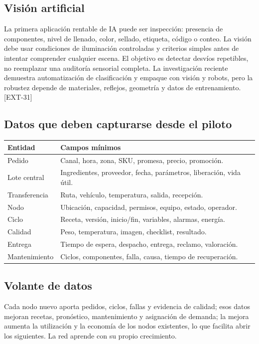 \documentclass[11pt,a4paper]{article}
\begin{document}
\subsection{Visión artificial}
La primera aplicación rentable de IA puede ser inspección: presencia de componentes, nivel de llenado,
color, sellado, etiqueta, código o conteo. La visión debe usar condiciones de iluminación controladas y
criterios simples antes de intentar comprender cualquier escena. El objetivo es detectar desvíos
repetibles, no reemplazar una auditoría sensorial completa. La investigación reciente demuestra
automatización de clasificación y empaque con visión y robots, pero la robustez depende de materiales,
reflejos, geometría y datos de entrenamiento. [EXT-31]

\subsection{Datos que deben capturarse desde el piloto}
{\small
\begin{xltabular}{\textwidth}{@{}P{3.2cm}L@{}}
\toprule
\textbf{Entidad} & \textbf{Campos mínimos}\\ \midrule
Pedido & Canal, hora, zona, SKU, promesa, precio, promoción.\\
Lote central & Ingredientes, proveedor, fecha, parámetros, liberación, vida útil.\\
Transferencia & Ruta, vehículo, temperatura, salida, recepción.\\
Nodo & Ubicación, capacidad, permisos, equipo, estado, operador.\\
Ciclo & Receta, versión, inicio/fin, variables, alarmas, energía.\\
Calidad & Peso, temperatura, imagen, checklist, resultado.\\
Entrega & Tiempo de espera, despacho, entrega, reclamo, valoración.\\
Mantenimiento & Ciclos, componentes, falla, causa, tiempo de recuperación.\\
\bottomrule
\end{xltabular}}

\subsection{Volante de datos}
Cada nodo nuevo aporta pedidos, ciclos, fallas y evidencia de calidad; esos datos mejoran recetas,
pronóstico, mantenimiento y asignación de demanda; la mejora aumenta la utilización y la economía de los
nodos existentes, lo que facilita abrir los siguientes. La red aprende con su propio crecimiento.
\end{document}
